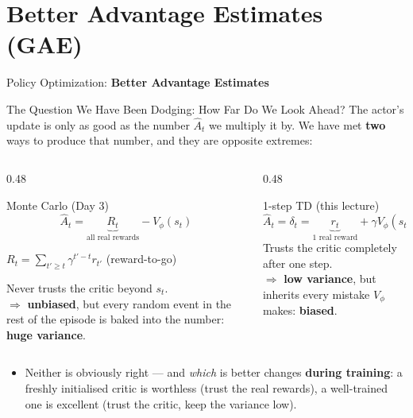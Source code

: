 \section{Better Advantage Estimates (GAE)}
\begin{frame}{}
    \LARGE Policy Optimization: \textbf{Better Advantage Estimates}
\end{frame}

\begin{frame}{The Question We Have Been Dodging: How Far Do We Look Ahead?}
The actor's update is only as good as the number $\hat{A}_t$ we multiply it by. We have met \textbf{two} ways to produce that number, and they are opposite extremes:
\vspace{0.4em}
\begin{columns}
\begin{column}{0.48\textwidth}
\begin{block}{Monte Carlo (Day 3)}
$$\hat{A}_t = \underbrace{R_t}_{\text{all real rewards}} - V_\phi(s_t)$$
\vspace{-0.9em}
\begin{center}\footnotesize $R_t = \sum_{t' \geq t} \gamma^{t'-t} r_{t'}$ (reward-to-go)\end{center}
Never trusts the critic beyond $s_t$.\\
$\Rightarrow$ \textbf{unbiased}, but every random event in the rest of the episode is baked into the number: \textbf{huge variance}.
\end{block}
\end{column}
\begin{column}{0.48\textwidth}
\begin{block}{1-step TD (this lecture)}
$$\hat{A}_t = \delta_t = \underbrace{r_t}_{\text{1 real reward}} + \gamma V_\phi(s_{t+1}) - V_\phi(s_t)$$
Trusts the critic completely after one step.\\
$\Rightarrow$ \textbf{low variance}, but inherits every mistake $V_\phi$ makes: \textbf{biased}.
\end{block}
\end{column}
\end{columns}
\vspace{0.6em}
\begin{itemize}
    \item Neither is obviously right --- and \emph{which} is better changes \textbf{during training}: a freshly initialised critic is worthless (trust the real rewards), a well-trained one is excellent (trust the critic, keep the variance low).
\end{itemize}
\end{frame}

